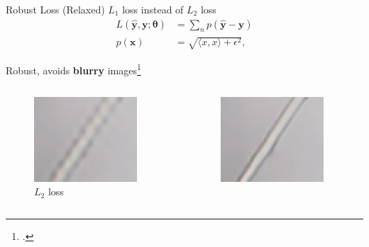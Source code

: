 \documentclass{beamer}
\begin{document}
\begin{frame}{Robust Loss}
(Relaxed) $L_1$  loss instead of $L_2$ loss
\begin{align*}
    \label{eq:charbonnier}
    L( \hat{\bm{y}}, \bm{y}; \bm{\theta}) &= \sum_n p \left( \bm{\hat{y}} - \bm{y} \right)\\
    p(\bm{x}) &= \sqrt{ \langle x, x \rangle  + \epsilon^2},
  \end{align*}

Robust, avoids \textbf{blurry} images\footcite{LapSRN}

\begin{columns}
  \begin{column}{0.33\linewidth}
    \begin{figure}[h]
      \centering
        \includegraphics[width=0.9\textwidth]{loss_functions_lap_l2}
      \caption*{$L_2$ loss}
    \end{figure}
  \end{column}
  \begin{column}{0.33\linewidth}
    \begin{figure}[h]
      \centering
        \includegraphics[width=0.9\textwidth]{loss_functions_lap_l1}

\end{figure}
\end{column}
\end{columns}
\end{frame}
\end{document}
